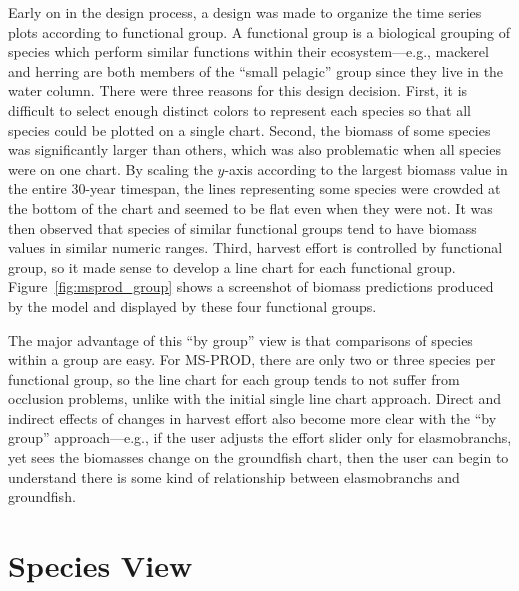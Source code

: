 Early on in the design process, a design was made to organize the time series plots according to functional group.  A functional group is a biological grouping of species which perform similar functions within their ecosystem---e.g., mackerel and herring are both members of the ``small pelagic'' group since they live in the water column.  There were three reasons for this design decision.  First, it is difficult to select enough distinct colors to represent each species so that all species could be plotted on a single chart.  Second, the biomass of some species was significantly larger than others, which was also problematic when all species were on one chart.  By scaling the $y$-axis according to the largest biomass value in the entire 30-year timespan, the lines representing some species were crowded at the bottom of the chart and seemed to be flat even when they were not.  It was then observed that species of similar functional groups tend to have biomass values in similar numeric ranges.  Third, harvest effort is controlled by functional group, so it made sense to develop a line chart for each functional group.  Figure~\ref{fig:msprod_group} shows a screenshot of biomass predictions produced by the model and displayed by these four functional groups.


The major advantage of this ``by group'' view is that comparisons of species within a group are easy.  For MS-PROD, there are only two or three species per functional group, so the line chart for each group tends to not suffer from occlusion problems, unlike with the initial single line chart approach.  Direct and indirect effects of changes in harvest effort also become more clear with the ``by group'' approach---e.g., if the user adjusts the effort slider only for elasmobranchs, yet sees the biomasses change on the groundfish chart, then the user can begin to understand there is some kind of relationship between elasmobranchs and groundfish.

\section{Species View}

